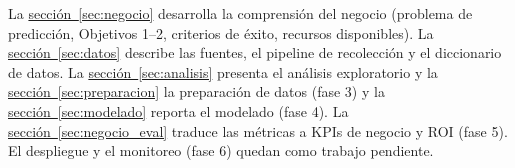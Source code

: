 La \hyperref[sec:negocio]{sección~\ref*{sec:negocio}} desarrolla la comprensión
del negocio (problema de predicción, Objetivos 1--2, criterios de éxito,
recursos disponibles). La
\hyperref[sec:datos]{sección~\ref*{sec:datos}} describe las fuentes, el
pipeline de recolección y el diccionario de datos. La
\hyperref[sec:analisis]{sección~\ref*{sec:analisis}} presenta el análisis
exploratorio y la \hyperref[sec:preparacion]{sección~\ref*{sec:preparacion}}
la preparación de datos (fase 3) y la
\hyperref[sec:modelado]{sección~\ref*{sec:modelado}} reporta el modelado
(fase 4). La \hyperref[sec:negocio_eval]{sección~\ref*{sec:negocio_eval}}
traduce las métricas a KPIs de negocio y ROI (fase 5). El despliegue y el
monitoreo (fase 6) quedan como trabajo pendiente.
